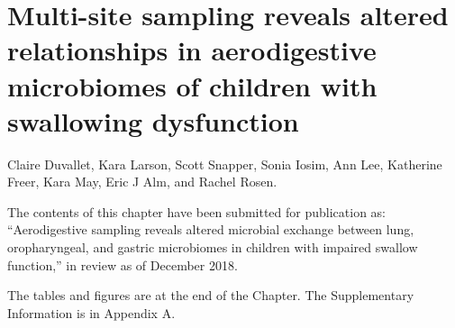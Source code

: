 
\graphicspath{{aspiration/figures/}}

\chapter{Multi-site sampling reveals altered relationships in aerodigestive microbiomes of children with swallowing dysfunction}

Claire Duvallet, Kara Larson, Scott Snapper, Sonia Iosim, Ann Lee, Katherine Freer, Kara May, Eric J Alm, and Rachel Rosen.

\bigskip
\bigskip
\noindent
The contents of this chapter have been submitted for publication as: ``Aerodigestive sampling reveals altered microbial exchange between lung, oropharyngeal, and gastric microbiomes in children with impaired swallow function,'' in review as of December 2018.

\bigskip
\bigskip
\noindent
The tables and figures are at the end of the Chapter. The Supplementary Information is in Appendix A.

\clearpage

